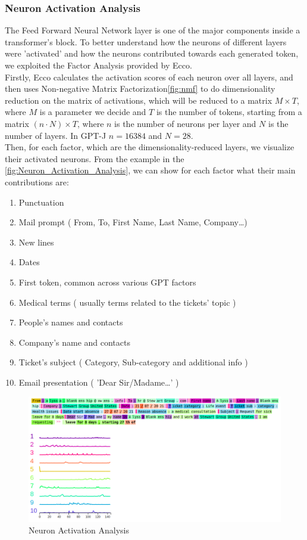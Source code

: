 \subsubsection*{Neuron Activation Analysis}
The Feed Forward Neural Network layer is one of the major components inside a transformer's block. To better understand how the neurons of different layers were 'activated' and how the neurons contributed towards each generated token, we exploited the Factor Analysis provided by Ecco. \\
Firstly, Ecco calculates the activation scores of each neuron over all layers, and then uses Non-negative Matrix Factorization\ref{fig:nmf} to do dimensionality reduction on the matrix of activations, which will be reduced to a matrix $M{\times}T$, where $M$ is a parameter we decide and $T$ is the number of tokens, starting from a matrix $ ( n \cdot N ){\times}T$, where $n$ is the number of neurons per layer and $N$ is the number of layers.
In GPT-J  $n = 16384$ and $N = 28$. \\
Then, for each factor, which are the dimensionality-reduced layers, we visualize their activated neurons.
From the example in the \autoref{fig:Neuron_Activation_Analysis}, we can show for each factor what their main contributions are:
\begin{enumerate}
    \item Punctuation
    \item Mail prompt ( From, To, First Name, Last Name, Company\dots)
    \item New lines
    \item Dates
    \item First token, common across various GPT factors
    \item Medical terms ( usually terms related to the tickets' topic )
    \item People's names and contacts
    \item Company's name and contacts
    \item Ticket's subject ( Category, Sub-category and additional info )
    \item Email presentation ( 'Dear Sir/Madame\dots' )
\end{enumerate}

\begin{figure}[h!] 
    \includegraphics[width=\textwidth]{images/Screenshot from 2022-11-28 15-26-01.png}
    \caption{Neuron Activation Analysis}
    \label{fig:Neuron_Activation_Analysis}
\end{figure}    


